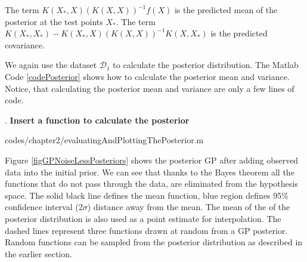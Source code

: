 The term $K(X_{*}, X)( K(X, X) )^{-1}f(X)$ is the predicted mean of the posterior at the test points $X_{*}$. The term $K(X_{*}, X_{*}) - K(X_{*}, X)( K(X, X) )^{-1} K(X, X_{*})$ is the predicted covariance. 

We again use the dataset $\mathcal{D}_{1}$ to calculate the posterior distribution. The Matlab Code \ref{codePosterior} shows how to calculate the posterior mean and variance. Notice, that calculating the posterior mean and variance are only a few lines of code. 

.%
\textbf{Insert a function to calculate the posterior}
\begin{mdframed}[hidealllines=true,backgroundcolor=lightgray!20]

                    {codes/chapter2/evaluatingAndPlottingThePosterior.m}
\end{mdframed}

Figure \ref{figGPNoiseLessPosteriors} shows the posterior GP after adding observed data into the initial prior. We can see that thanks to the Bayes theorem all the functions that do not pass through the data, are eliminated from the hypothesis space. The solid black line defines the mean function, blue region defines 95\% confidence interval (2$\sigma$) distance away from the mean. The mean of the of the posterior distribution is also used as a point estimate for interpolation. The dashed lines represent three functions drawn at random from a GP posterior. Random functions can be sampled from the posterior distribution as described in the earlier section. 


